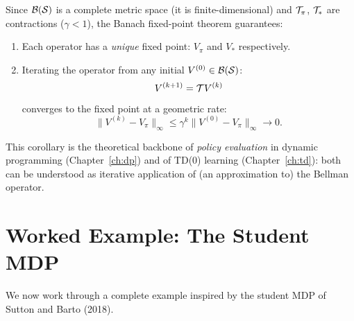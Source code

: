 \begin{corollary}
\label{cor:banach}
Since $\mathcal{B}(\mathcal{S})$ is a complete metric space (it is finite-dimensional) and $\mathcal{T}_\pi$, $\mathcal{T}_*$ are contractions ($\gamma < 1$), the Banach fixed-point theorem guarantees:
\begin{enumerate}
  \item Each operator has a \emph{unique} fixed point: $V_\pi$ and $V_*$ respectively.
  \item Iterating the operator from any initial $V^{(0)} \in \mathcal{B}(\mathcal{S})$:
        \[V^{(k+1)} = \mathcal{T} V^{(k)}\]
        converges to the fixed point at a geometric rate:
        \[
        \|V^{(k)} - V_\pi\|_\infty \le \gamma^k \|V^{(0)} - V_\pi\|_\infty \to 0.
        \]
\end{enumerate}
\end{corollary}

This corollary is the theoretical backbone of \emph{policy evaluation} in dynamic programming (Chapter~\ref{ch:dp}) and of TD(0) learning (Chapter~\ref{ch:td}): both can be understood as iterative application of (an approximation to) the Bellman operator.


\section{Worked Example: The Student MDP}
\label{sec:student-mdp}

We now work through a complete example inspired by the student MDP of Sutton and Barto (2018).

